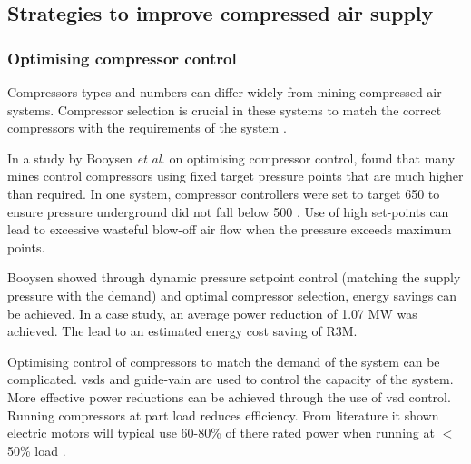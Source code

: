 	\subsection{Strategies to improve compressed air supply}

		\subsubsection{Optimising compressor control}
		Compressors types and numbers can differ widely from mining compressed air systems. Compressor selection is crucial in these systems to match the correct compressors with the requirements of the system \cite{marais2010expert}.
		\par 
		In a study by Booysen \textit{et al.} \cite{Booysen2012Masters} on optimising compressor control, \cite{Booysen2012Masters} found that many mines control compressors using fixed target pressure points that are much higher than required. In one system, compressor controllers were set to target 650  to ensure pressure underground did not fall below 500 . Use of high set-points can lead to excessive wasteful blow-off air flow when the pressure exceeds maximum points.
		\par
		Booysen \cite{booysen2009optimising} showed through dynamic pressure setpoint control (matching the supply pressure with the demand) and optimal compressor selection, energy savings can be achieved. In a case study, an average power reduction of 1.07 MW was achieved. The lead to an estimated energy cost saving of R3M.
		\par 
	 	Optimising control of compressors to match the demand of the system can be complicated. \glspl{vsd} and guide-vain are used to control the capacity of the system. More effective power reductions can be achieved through the use of \gls{vsd} control. Running compressors at part load reduces efficiency. From literature it shown electric motors will typical use 60-80\% of there rated power when running at $<$50\% load \cite{Saidur2010}.
		
		
